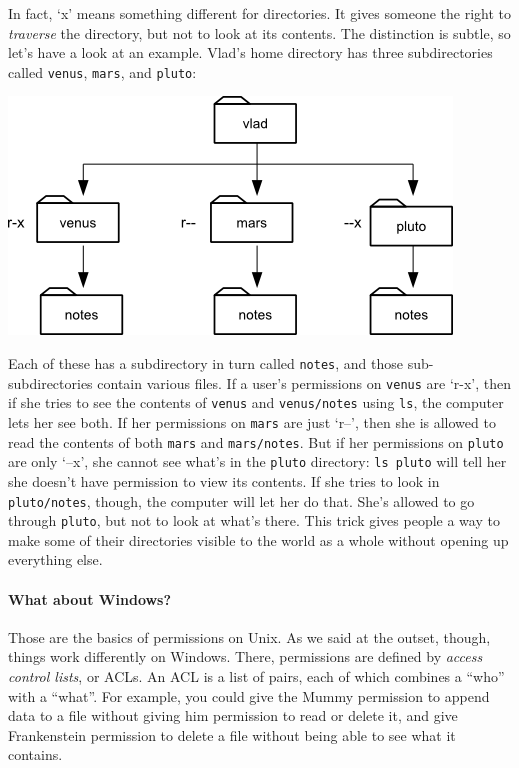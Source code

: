 \documentclass[]{book}
\newcommand{\gdef}[2]{\emph{#2}}
\begin{document}
In fact, `x' means something different for directories. It gives someone
the right to \emph{traverse} the directory, but not to look at its
contents. The distinction is subtle, so let's have a look at an example.
Vlad's home directory has three subdirectories called \texttt{venus},
\texttt{mars}, and \texttt{pluto}:

\includegraphics{novice/extras/img/x-for-directories.png}

Each of these has a subdirectory in turn called \texttt{notes}, and
those sub-subdirectories contain various files. If a user's permissions
on \texttt{venus} are `r-x', then if she tries to see the contents of
\texttt{venus} and \texttt{venus/notes} using \texttt{ls}, the computer
lets her see both. If her permissions on \texttt{mars} are just `r--',
then she is allowed to read the contents of both \texttt{mars} and
\texttt{mars/notes}. But if her permissions on \texttt{pluto} are only
`--x', she cannot see what's in the \texttt{pluto} directory:
\texttt{ls pluto} will tell her she doesn't have permission to view its
contents. If she tries to look in \texttt{pluto/notes}, though, the
computer will let her do that. She's allowed to go through
\texttt{pluto}, but not to look at what's there. This trick gives people
a way to make some of their directories visible to the world as a whole
without opening up everything else.

\mbox{}\paragraph{What about Windows?}

Those are the basics of permissions on Unix. As we said at the outset,
though, things work differently on Windows. There, permissions are
defined by \gdef{g:access-control-list}{access control lists}, or
ACLs. An ACL is a list of pairs, each of which combines a ``who'' with a
``what''. For example, you could give the Mummy permission to append
data to a file without giving him permission to read or delete it, and
give Frankenstein permission to delete a file without being able to see
what it contains.
\end{document}
